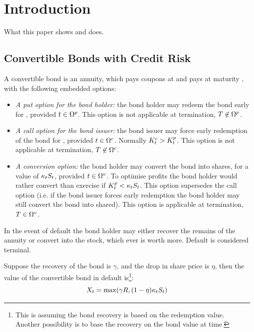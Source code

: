 \documentclass[a4paper,11pt,oneside]{report}
\theoremstyle{plain}
\theoremstyle{definition}
\begin{document}
\chapter{Introduction}
What this paper shows and does.


\section{Convertible Bonds with Credit Risk}
A convertible bond is an annuity, which pays coupons \C at \ti and pays \R at maturity \T, with the following embedded options:
\begin{itemize}
 \item \emph{A put option for the bond holder:} the bond holder may redeem the bond early for \Kp, provided $t \in \Omega^{p}$.  This option is not applicable at termination, $T \not\in \Omega^{p}$.
 \item \emph{A call option for the bond issuer:} the bond issuer may force early redemption of the bond for \Kc, provided $t \in \Omega^{c}$.  Normally $K^{c}_t > K^{p}_t$.  This option is not applicable at termination, $T \not\in \Omega^{c}$.
 \item \emph{A conversion option:} the bond holder may convert the bond into \Kv shares, for a value of $\kappa_tS_t$, provided $t \in \Omega^{v}$.  To optimise profits the bond holder would rather convert than exercise if $K^{p}_t < \kappa_tS_t$.  This option supersedes the call option (i.e. if the bond issuer forces early redemption the bond holder may still convert the bond into shared).  This option is applicable at termination, $T \in \Omega^{v}$.
\end{itemize}

In the event of default the bond holder may either recover the remains of the annuity or convert into the stock, which ever is worth more.  Default is considered terminal.

Suppose the recovery of the bond is $\gamma$, and the drop in share price is $\eta$, then the value of the convertible bond in default is\footnote{This is assuming the bond recovery is based on the redemption value.  Another possibility is to base the recovery on the bond value at time \t}:
\begin{equation}
 X_t = \max(\gamma R, (1 - \eta)\kappa_tS_t)
\end{equation}
\end{document}
